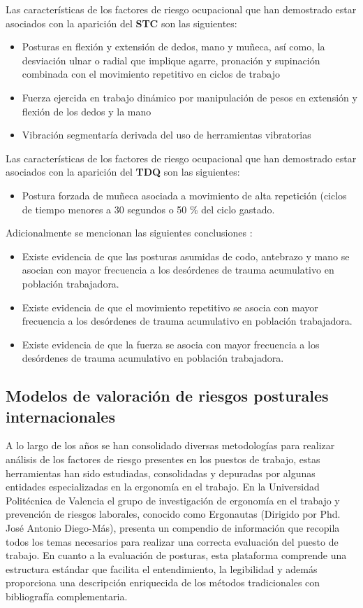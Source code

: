 Las características de los factores de riesgo ocupacional que han demostrado estar asociados con la aparición del \textbf{STC} son las siguientes:\parencite[45]{MinisteriodeProteccionSocialdeColombia2006GuiaSuperiores}
\begin{itemize}
\item Posturas en flexión y extensión de dedos, mano y muñeca, así como, la desviación ulnar o radial que implique agarre, pronación y supinación combinada con el movimiento repetitivo en ciclos de trabajo
\item Fuerza ejercida en trabajo dinámico por manipulación de pesos en extensión y flexión de los dedos y la mano
\item Vibración segmentaría derivada del uso de herramientas vibratorias
\end{itemize}
Las características de los factores de riesgo ocupacional que han demostrado estar asociados con la aparición del \textbf{TDQ} son las siguientes\parencite[45]{MinisteriodeProteccionSocialdeColombia2006GuiaSuperiores}:
\begin{itemize}
\item Postura forzada de muñeca asociada a movimiento de alta repetición (ciclos de tiempo menores a 30 segundos o 50 \% del ciclo gastado.
\end{itemize}
Adicionalmente se mencionan las siguientes conclusiones \parencite[46]{MinisteriodeProteccionSocialdeColombia2006GuiaSuperiores}:
\begin{itemize}
\item Existe evidencia de que las posturas asumidas de codo, antebrazo y mano se asocian con mayor frecuencia a los desórdenes de trauma acumulativo en población trabajadora.
\item Existe evidencia de que el movimiento repetitivo se asocia con mayor frecuencia a los desórdenes de trauma acumulativo en población trabajadora.
\item Existe evidencia de que la fuerza se asocia con mayor frecuencia a los desórdenes de trauma acumulativo en población trabajadora.
\end{itemize}
\subsection{Modelos de valoración de riesgos posturales internacionales}
A lo largo de los años se han consolidado diversas metodologías para realizar análisis de los factores de riesgo presentes en los puestos de trabajo, estas herramientas han sido estudiadas, consolidadas y depuradas por algunas entidades especializadas en la ergonomía en el trabajo. En la Universidad Politécnica de Valencia el grupo de investigación de ergonomía en el trabajo y prevención de riesgos laborales, conocido como Ergonautas (Dirigido por Phd. José Antonio Diego-Más), presenta un compendio de información que recopila todos los temas necesarios para realizar una correcta evaluación del puesto de trabajo. En cuanto a la evaluación de posturas, esta plataforma comprende una estructura estándar que facilita el entendimiento, la legibilidad y además proporciona una descripción enriquecida de los métodos tradicionales con bibliografía complementaria. 

